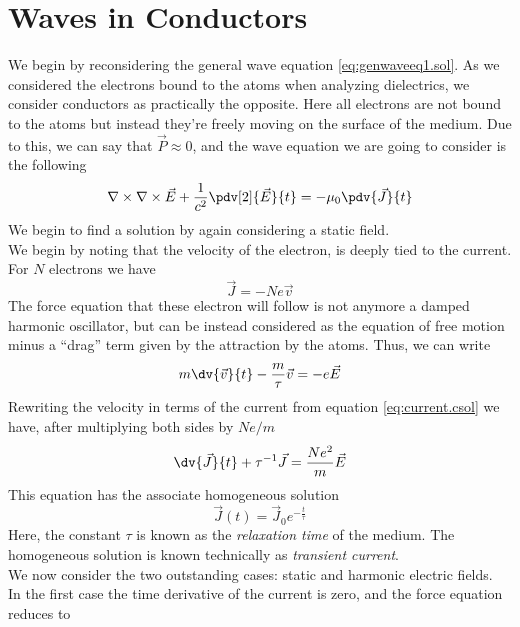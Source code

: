 \documentclass[../electromagnetism.tex]{subfiles}
\begin{document}
\section{Waves in Conductors}
We begin by reconsidering the general wave equation \eqref{eq:genwaveeq1.sol}. As we considered the electrons bound to the atoms when analyzing dielectrics, we consider conductors as practically the opposite. Here all electrons are not bound to the atoms but instead they're freely moving on the surface of the medium. Due to this, we can say that $\vec{P}\approx0$, and the wave equation we are going to consider is the following
\begin{equation}
	\nabla\times\nabla\times\vec{E}+\frac{1}{c^2}\pdv[2]{\vec{E}}{t}=-\mu_0\pdv{\vec{J}}{t}
	\label{eq:metalweq.csol}
\end{equation}
We begin to find a solution by again considering a static field.\\
We begin by noting that the velocity of the electron, is deeply tied to the current. For $N$ electrons we have
\begin{equation}
	\vec{J}=-Ne\vec{v}
	\label{eq:current.csol}
\end{equation}
The force equation that these electron will follow is not anymore a damped harmonic oscillator, but can be instead considered as the equation of free motion minus a ``drag'' term given by the attraction by the atoms. Thus, we can write
\begin{equation}
	m\dv{\vec{v}}{t}-\frac{m}{\tau}\vec{v}=-e\vec{E}
	\label{eq:forceeq.csol}
\end{equation}
Rewriting the velocity in terms of the current from equation \eqref{eq:current.csol} we have, after multiplying both sides by $Ne/m$
\begin{equation}
	\dv{\vec{J}}{t}+\tau^{-1}\vec{J}=\frac{Ne^2}{m}\vec{E}
	\label{eq:odetosolve.csol}
\end{equation}
This equation has the associate homogeneous solution
\begin{equation}
	\vec{J}(t)=\vec{J}_0e^{-\frac{t}{\tau}}
	\label{eq:odehom.csol}
\end{equation}
Here, the constant $\tau$ is known as the \textit{relaxation time} of the medium. The homogeneous solution is known technically as \textit{transient current}.\\
We now consider the two outstanding cases: static and harmonic electric fields.\\
In the first case the time derivative of the current is zero, and the force equation reduces to
\end{document}
